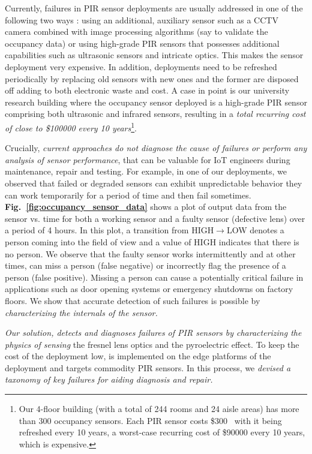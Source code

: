 Currently, failures in PIR sensor deployments are usually addressed in one of the following two ways : \ca using an additional, auxiliary sensor such as a CCTV camera combined with image processing algorithms (say to validate the occupancy data) or \cb using high-grade PIR sensors that possesses additional capabilities such as ultrasonic sensors and intricate optics. This makes the sensor deployment very expensive. %
In addition, deployments need to be refreshed periodically by replacing old sensors with new ones and the former are disposed off %
adding to both electronic waste and cost. A case in point is our university research building where the occupancy sensor deployed is a high-grade PIR sensor comprising both ultrasonic and infrared sensors, resulting in a \emph{total recurring cost of close to \$100000 every 10 years}\footnote{Our 4-floor building (with a total of 244 rooms and 24 aisle areas) has more than 300 occupancy sensors. Each PIR sensor costs \$300~\cite{hubbell_ADT1600WRP, hubbell_ATD2000CRP} with it being refreshed every 10 years, a worst-case recurring cost of \$90000 every 10 years, which is expensive.}.




Crucially, \textit{current approaches do not diagnose the cause of failures or perform any analysis of sensor performance}, that can be valuable for IoT %
engineers during maintenance, repair and testing. For example, in one of our deployments, we observed that failed or degraded sensors can exhibit unpredictable behavior \eg they can work temporarily for a period of time and then fail sometimes. {\bfseries  Fig.~\ref{fig:occupancy_sensor_data}} shows a plot of output data from the sensor vs. time for both a working sensor and a faulty sensor (defective lens) over a period of 4 hours.
In this plot, a transition from HIGH$\rightarrow$LOW denotes a person coming into the field of view %
and a value of HIGH indicates that there is no person. %
We observe that the faulty sensor works intermittently and at other times, can miss a person (false negative) or incorrectly flag the presence of a person (false positive).
Missing a person can cause a potentially critical failure in applications such as door opening systems or emergency shutdowns on factory floors.
We show that accurate detection of such failures is possible by \textit{characterizing the internals of the sensor.}




\emph{Our solution, \sol detects and diagnoses failures of PIR sensors by characterizing the physics of sensing} \viz the fresnel lens optics and the pyroelectric effect. %
To keep the cost of the deployment low, \sol is implemented on the edge platforms of the deployment and targets commodity PIR sensors.
In this process, %
we \emph{devised a taxonomy of key failures for aiding diagnosis and repair.} 

